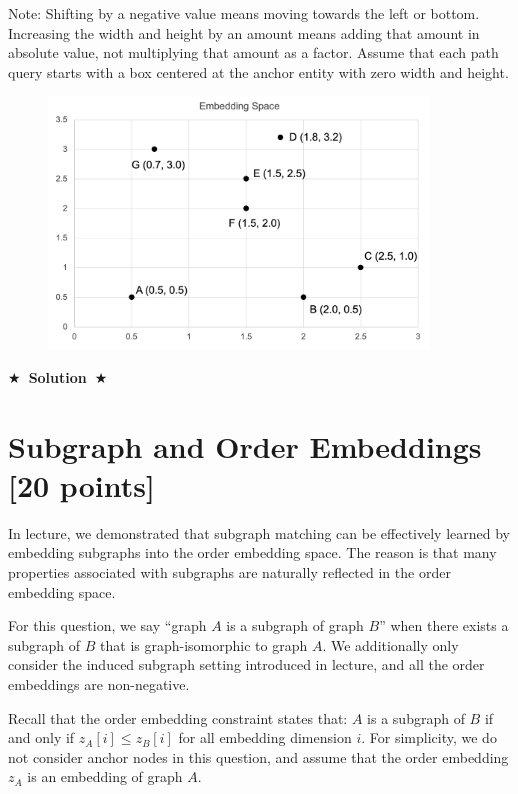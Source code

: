 \documentclass[11pt]{article}
\numberwithin{figure}{section}
\newcommand{\Solution}[1]{{\medskip \color{red} \bf $\bigstar$~\sf \textbf{Solution}~$\bigstar$ \sf #1 } \bigskip}
\begin{document}
Note: Shifting by a negative value means moving towards the left or bottom. Increasing the width and height by an amount means adding that amount in absolute value, not multiplying that amount as a factor. Assume that each path query starts with a box centered at the anchor entity with zero width and height.

\begin{figure}[H]
    \centering
    \includegraphics[width=0.9\textwidth]{CS224W_Homework2/5.4.png}
    \label{fig:5.4}
\end{figure}

\Solution{}

\newpage


\section{Subgraph and Order Embeddings [20 points]}

In lecture, we demonstrated that subgraph matching can be effectively learned by embedding subgraphs into the order embedding space. The reason is that many properties associated with subgraphs are naturally reflected in the order embedding space.

For this question, we say “graph $A$ is a subgraph of graph $B$” when there exists a subgraph of $B$ that is graph-isomorphic to graph $A$. We additionally only consider the induced subgraph setting introduced in lecture, and all the order embeddings are non-negative.

Recall that the order embedding constraint states that: $A$ is a subgraph of $B$ if and only if $z_A[i] \leq z_B[i]$ for all embedding dimension $i$. For simplicity, we do not consider anchor nodes in this question, and assume that the order embedding $z_A$ is an embedding of graph $A$.
\end{document}
